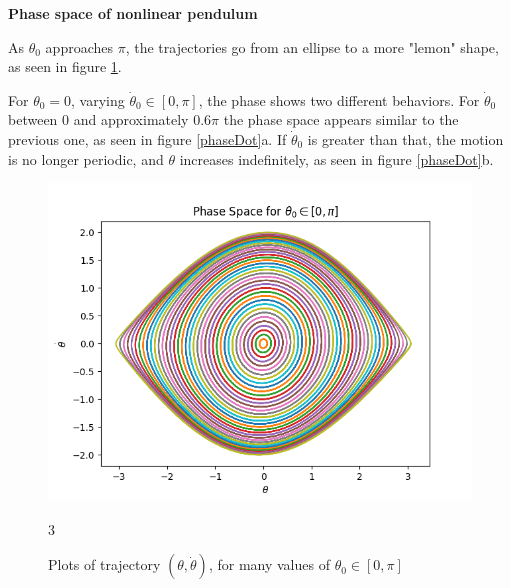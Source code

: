 

\begin{problem}{1}
	\textbf{Phase space of nonlinear pendulum}

	As $\theta_{0}$ approaches $\pi$, the trajectories go from an ellipse to a more "lemon" shape, as seen in figure \ref{phase}.

	For $\theta_{0} = 0$, varying $\dot{\theta}_{0} \in [0,\pi]$, the phase shows two different behaviors.  For $\dot{\theta}_{0}$ between 0 and approximately $0.6\pi$ the phase space appears similar to the previous one, as seen in figure \ref{phaseDot}a.  If $\dot{\theta}_{0}$ is greater than that, the motion is no longer periodic, and $\theta$ increases indefinitely, as seen in figure \ref{phaseDot}b.

\begin{figure}[ht!]
	\centering
	\includegraphics[scale=0.6]{../figures/phaseSpace.png}
	\caption{Plots of trajectory $(\theta,\dot{\theta})$, for many values of $\theta_{0} \in [0,\pi]$}
	3\label{phase}
\end{figure}


\end{problem}
